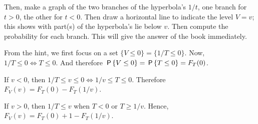 \begin{exercise}
\begin{hint}
Then, make a graph of the two branches of the hyperbola's $1/t$, one branch for $t>0$, the other for $t<0$.
Then draw a horizontal line to indicate the level $V=v$; this shows with part(s) of the hyperbola's lie below $v$.
Then compute the probability for each branch. This will give the answer of the  book immediately.
\end{hint}
\begin{solution}

From the hint, we first focus on a set $\{V\leq 0\} = \{1/T \leq 0\}$. Now,  $1/T\leq 0 \iff T\leq 0$. And therefore $\P{V\leq 0} = \P{T\leq 0} = F_T(0)$.

If $v<0$, then $1/T \leq v \leq 0\iff 1/v \leq T \leq 0$. Therefore
$F_V(v) = F_T(0) - F_T(1/v)$.

If $v>0$, then $1/T \leq v$ when $T<0$ or $T\geq 1/v$. Hence,
$F_V(v) = F_T(0) + 1- F_T(1/v)$.
\end{solution}
\end{exercise}

